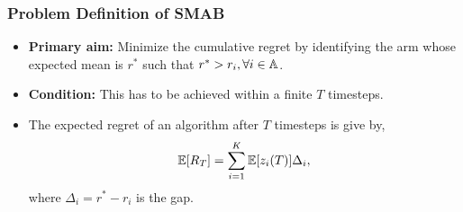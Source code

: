 \begin{frame}
\frametitle{Problem Definition of SMAB}
\begin{itemize}
\item<1-> \textbf{Primary aim:} Minimize the cumulative regret by identifying the arm whose expected mean is $r^*$ such that $r^* > r_i,\forall i\in\mathbb{A}$.
\item<2-> \textbf{Condition:} This has to be achieved within a finite $T$ timesteps.
\item<3-> The expected regret of an algorithm after $T$ timesteps is give by,
\begin{align*}
\mathbb{E}[R_{T}]= \sum_{i=1}^{K} \mathbb{E}[z_i (T)] \Delta_i,
\end{align*}
where $\Delta_{i}=r^{*}-r_{i}$ is the gap.
\end{itemize}
\end{frame}

%
%

